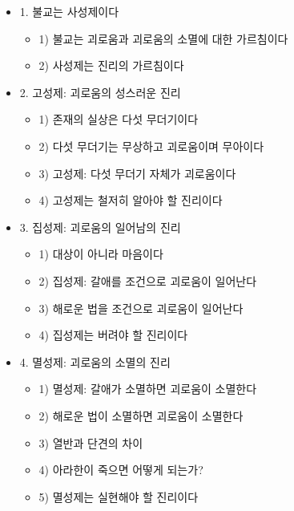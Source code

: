 \documentclass[	14pt, 
							a1paper, 
							portrait, %
							margin=0mm, %
							innermargin=10mm,  		%
							colspace=5mm, 
							subcolspace=0mm
							]{tikzposter}
\begin{document}
\begin{columns}
{\begin{itemize}
					\item 1. 불교는 사성제이다
						\begin{itemize}
						\item 1) 불교는 괴로움과 괴로움의 소멸에 대한 가르침이다
						\item 2) 사성제는 진리의 가르침이다
						\end{itemize}
					\item 2. 고성제: 괴로움의 성스러운 진리
						\begin{itemize}
						\item 1) 존재의 실상은 다섯 무더기이다
						\item 2) 다섯 무더기는 무상하고 괴로움이며 무아이다
						\item 3) 고성제: 다섯 무더기 자체가 괴로움이다
						\item 4) 고성제는 철저히 알아야 할 진리이다
						\end{itemize}

					\item 3. 집성제: 괴로움의 일어남의 진리
						\begin{itemize}
						\item 1) 대상이 아니라 마음이다
						\item 2) 집성제: 갈애를 조건으로 괴로움이 일어난다
						\item 3) 해로운 법을 조건으로 괴로움이 일어난다
						\item 4) 집성제는 버려야 할 진리이다
						\end{itemize}

					\item 4. 멸성제: 괴로움의 소멸의 진리
						\begin{itemize}
						\item 1) 멸성제: 갈애가 소멸하면 괴로움이 소멸한다
						\item 2) 해로운 법이 소멸하면 괴로움이 소멸한다
						\item 3) 열반과 단견의 차이
						\item 4) 아라한이 죽으면 어떻게 되는가?
						\item 5) 멸성제는 실현해야 할 진리이다
						\end{itemize}


\end{itemize}}
\end{columns}
\end{document}
